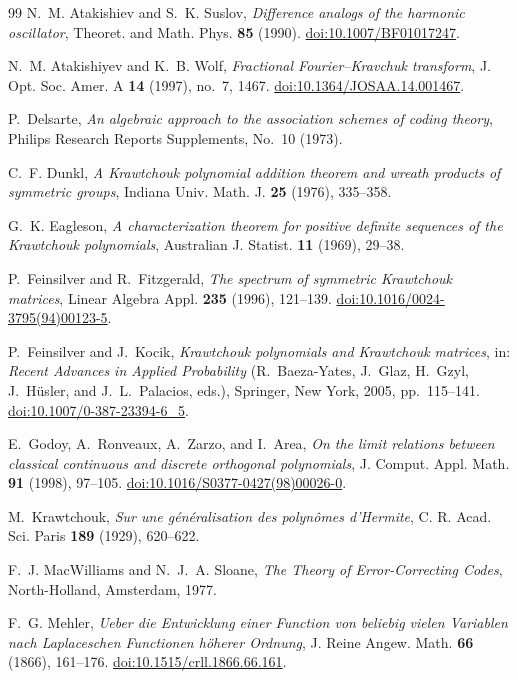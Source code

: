 \documentclass[11pt,reqno]{amsart}
\theoremstyle{definition}
\theoremstyle{remark}
\begin{document}
\begin{thebibliography}{99}
N.~M. Atakishiev and S.~K. Suslov, \emph{Difference analogs of the
harmonic oscillator}, Theoret. and Math. Phys. \textbf{85} (1990).
\href{https://doi.org/10.1007/BF01017247}{doi:10.1007/BF01017247}.

N.~M. Atakishiyev and K.~B. Wolf, \emph{Fractional Fourier--Kravchuk
transform}, J. Opt. Soc. Amer. A \textbf{14} (1997), no.~7, 1467.
\href{https://doi.org/10.1364/JOSAA.14.001467}{doi:10.1364/JOSAA.14.001467}.

P.~Delsarte, \emph{An algebraic approach to the association schemes of
coding theory}, Philips Research Reports Supplements, No.~10 (1973).

C.~F. Dunkl, \emph{A Krawtchouk polynomial addition theorem and wreath
products of symmetric groups}, Indiana Univ. Math. J. \textbf{25}
(1976), 335--358.

G.~K. Eagleson, \emph{A characterization theorem for positive definite
sequences of the Krawtchouk polynomials}, Australian J. Statist.
\textbf{11} (1969), 29--38.

P.~Feinsilver and R.~Fitzgerald, \emph{The spectrum of symmetric
Krawtchouk matrices}, Linear Algebra Appl. \textbf{235} (1996), 121--139.
\href{https://doi.org/10.1016/0024-3795(94)00123-5}{doi:10.1016/0024-3795(94)00123-5}.

P.~Feinsilver and J.~Kocik, \emph{Krawtchouk polynomials and Krawtchouk
matrices}, in: \emph{Recent Advances in Applied Probability}
(R.~Baeza-Yates, J.~Glaz, H.~Gzyl, J.~H\"usler, and J.~L.~Palacios, eds.),
Springer, New York, 2005, pp.~115--141.
\href{https://doi.org/10.1007/0-387-23394-6_5}{doi:10.1007/0-387-23394-6\_5}.

E.~Godoy, A.~Ronveaux, A.~Zarzo, and I.~Area, \emph{On the limit
relations between classical continuous and discrete orthogonal
polynomials}, J. Comput. Appl. Math. \textbf{91} (1998), 97--105.
\href{https://doi.org/10.1016/S0377-0427(98)00026-0}{doi:10.1016/S0377-0427(98)00026-0}.

M.~Krawtchouk, \emph{Sur une g\'en\'eralisation des polyn\^omes
d'Hermite}, C. R. Acad. Sci. Paris \textbf{189} (1929), 620--622.

F.~J. MacWilliams and N.~J.~A. Sloane, \emph{The Theory of
Error-Correcting Codes}, North-Holland, Amsterdam, 1977.

F.~G. Mehler, \emph{Ueber die Entwicklung einer Function von beliebig
vielen Variablen nach Laplaceschen Functionen h\"oherer Ordnung},
J. Reine Angew. Math. \textbf{66} (1866), 161--176.
\href{https://doi.org/10.1515/crll.1866.66.161}{doi:10.1515/crll.1866.66.161}.
\end{thebibliography}
\end{document}
